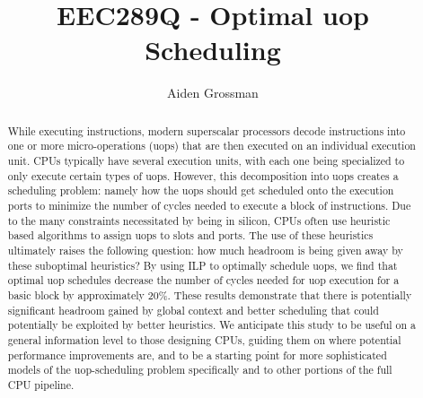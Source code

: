\documentclass[sigconf]{acmart}
\begin{document}
\title{EEC289Q - Optimal uop Scheduling}


\author{Aiden Grossman}


\begin{abstract}
While executing instructions, modern superscalar processors decode instructions into one or more
micro-operations (uops) that are then executed on an individual execution unit. CPUs typically have
several execution units, with each one being specialized to only execute certain types of uops. However,
this decomposition into uops creates a scheduling problem: namely how the uops should get scheduled onto
the execution ports to minimize the number of cycles needed to execute a block of instructions. Due to the
many constraints necessitated by being in silicon, CPUs often use heuristic based algorithms to assign uops
to slots and ports. The use of these heuristics ultimately raises the following question: how much headroom
is being given away by these suboptimal heuristics? By using ILP to optimally schedule uops, we find that
optimal uop schedules decrease the number of cycles needed for uop execution for a basic block by approximately
20\%. These results demonstrate that there is potentially significant headroom gained by global context and
better scheduling that could potentially be exploited by better heuristics. We anticipate this study to be
useful on a general information level to those designing CPUs, guiding them on where potential performance
improvements are, and to be a starting point for more sophisticated models of the uop-scheduling problem
specifically and to other portions of the full CPU pipeline.
\end{abstract}
\end{document}
